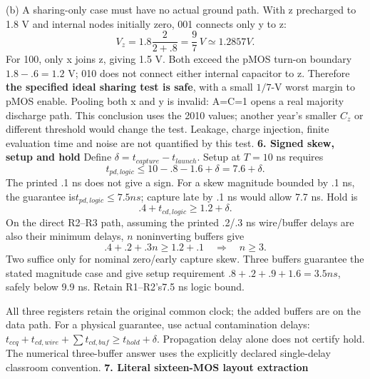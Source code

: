 \documentclass[10pt]{article}
\begin{document}
(b) A sharing-only case must have no actual ground path. With z precharged to 1.8 V and internal nodes initially zero, 001 connects only y to z:
\[V_z=1.8\frac{2}{2+.8}=\frac97\,V\simeq1.2857V.\]
For 100, only x joins z, giving 1.5 V. Both exceed the pMOS turn-on boundary $1.8-.6=1.2$ V; 010 does not connect either internal capacitor to z. Therefore \textbf{the specified ideal sharing test is safe}, with a small $1/7$-V worst margin to pMOS enable. Pooling both x and y is invalid: A=C=1 opens a real majority discharge path. This conclusion uses the 2010 values; another year's smaller $C_z$ or different threshold would change the test. Leakage, charge injection, finite evaluation time and noise are not quantified by this test.
\newpage
\textbf{6. Signed skew, setup and hold}
Define $\delta=t_{capture}-t_{launch}$. Setup at $T=10$ ns requires
\[t_{pd,logic}\le10-.8-1.6+\delta=7.6+\delta.\]
The printed .1 ns does not give a sign. For a skew magnitude bounded by .1 ns, the guarantee is$\boxed{t_{pd,logic}\le7.5 ns}$; capture late by .1 ns would allow 7.7 ns. Hold is
\[.4+t_{cd,logic}\ge1.2+\delta.\]
On the direct R2--R3 path, assuming the printed .2/.3 ns wire/buffer delays are also their minimum delays, $n$ noninverting buffers give
\[.4+.2+.3n\ge1.2+.1\quad\Longrightarrow\quad n\ge3.\]
Two suffice only for nominal zero/early capture skew. Three buffers guarantee the stated magnitude case and give setup requirement $.8+.2+.9+1.6=3.5ns$, safely below 9.9 ns. Retain R1--R2's7.5 ns logic bound.
\begin{center}\end{center}
All three registers retain the original common clock; the added buffers are on the data path. For a physical guarantee, use actual contamination delays: $t_{ccq}+t_{cd,wire}+\sum t_{cd,buf}\ge t_{hold}+\delta$. Propagation delay alone does not certify hold. The numerical three-buffer answer uses the explicitly declared single-delay classroom convention.
\newpage\textbf{7. Literal sixteen-MOS layout extraction}
\end{document}
